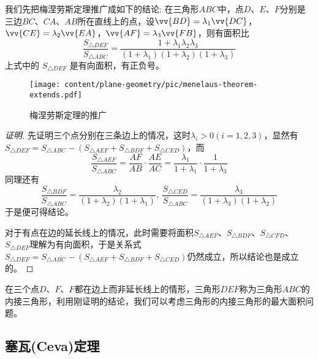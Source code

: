 \begin{example}
  我们先把梅涅劳斯定理推广成如下的结论: 在三角形$ABC$中，点$D$、$E$、$F$分别是三边$BC$、$CA$、$AB$所在直线上的点，设$\vv{BD}=\lambda_1\vv{DC}$，$\vv{CE}=\lambda_2\vv{EA}$，$\vv{AF}=\lambda_3\vv{FB}$，则有面积比
  \begin{equation*}
    \frac{S_{\triangle DEF}}{S_{\triangle ABC}} = \frac{1+\lambda_1\lambda_2\lambda_3}{(1+\lambda_1)(1+\lambda_2)(1+\lambda_3)}
  \end{equation*}
  上式中的 $S_{\triangle DEF}$ 是有向面积，有正负号。
 
\begin{figure}[htbp]
\centering
\texttt{[image: content/plane-geometry/pic/menelaus-theorem-extends.pdf]}
\caption{梅涅劳斯定理的推广}
\label{fig:menelaus-theorem-extends}
\end{figure}

\begin{proof}[证明]
  先证明三个点分别在三条边上的情况，这时$\lambda_i>0(i=1,2,3)$，显然有$S_{\triangle DEF} = S_{\triangle ABC} - (S_{\triangle AEF}+S_{\triangle BDF}+S_{\triangle CED})$，而
  \begin{equation*}
    \frac{S_{\triangle AEF}}{S_{\triangle ABC}} = \frac{AF}{AB} \cdot \frac{AE}{AC} = \frac{\lambda_1}{1+\lambda_1} \cdot \frac{1}{1+\lambda_3}
  \end{equation*}
  同理还有
  \begin{equation*}
   \frac{S_{\triangle BDF}}{S_{\triangle ABC}} = \frac{\lambda_2}{(1+\lambda_2)(1+\lambda_1)}, \  \frac{S_{\triangle CED}}{S_{\triangle ABC}} = \frac{\lambda_3}{(1+\lambda_3)(1+\lambda_2)} 
 \end{equation*}
 于是便可得结论。

 对于有点在边的延长线上的情况，此时需要将面积$S_{\triangle AEF}$、$S_{\triangle BDF}$、$S_{\triangle CFD}$、$S_{\triangle DEF}$理解为有向面积，于是关系式$S_{\triangle DEF} = S_{\triangle ABC} - (S_{\triangle AEF}+S_{\triangle BDF}+S_{\triangle CED})$仍然成立，所以结论也是成立的。
\end{proof}

在三个点$D$、$F$、$F$都在边上而非延长线上的情形，三角形$DEF$称为三角形$ABC$的内接三角形，利用刚证明的结论，我们可以考虑三角形的内接三角形的最大面积问题。

\end{example}

\subsection{塞瓦(Ceva)定理}
\label{sec:cevian-theorem}

